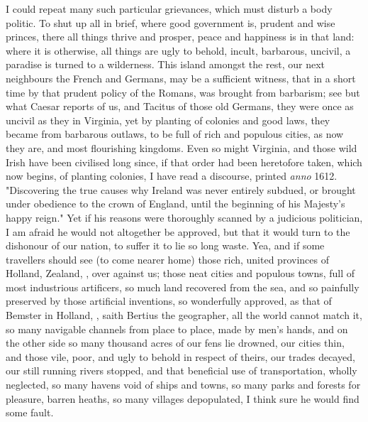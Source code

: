 I could repeat many such particular grievances, which must disturb a body
politic. To shut up all in brief, where good government is, prudent and wise
princes, there all things thrive and prosper, peace and happiness is in that
land: where it is otherwise, all things are ugly to behold, incult, barbarous,
uncivil, a paradise is turned to a wilderness. This island amongst the rest,
our next neighbours the French and Germans, may be a sufficient witness, that
in a short time by that prudent policy of the Romans, was brought from
barbarism; see but what Caesar reports of us, and Tacitus of those old Germans,
they were once as uncivil as they in Virginia, yet by planting of colonies and
good laws, they became from barbarous outlaws, to be full
of rich and populous cities, as now they are, and most flourishing kingdoms.
Even so might Virginia, and those wild Irish have been civilised long since, if
that order had been heretofore taken, which now begins, of planting colonies,
\etc{} I have read a discourse, printed \emph{anno} 1612.
"Discovering the true causes why Ireland was never entirely subdued, or brought
under obedience to the crown of England, until the beginning of his Majesty's
happy reign." Yet if his reasons were thoroughly scanned by a judicious
politician, I am afraid he would not altogether be approved, but that it would
turn to the dishonour of our nation, to suffer it to lie so long waste. Yea,
and if some travellers should see (to come nearer home) those rich, united
provinces of Holland, Zealand, \etc{}, over against us; those neat cities and
populous towns, full of most industrious artificers, so
much land recovered from the sea, and so painfully preserved by those
artificial inventions, so wonderfully approved, as that of Bemster in Holland,
, saith Bertius the
geographer, all the world cannot match it, so many
navigable channels from place to place, made by men's hands, \etc{} and on the
other side so many thousand acres of our fens lie drowned, our cities thin, and
those vile, poor, and ugly to behold in respect of theirs, our trades decayed,
our still running rivers stopped, and that beneficial use of transportation,
wholly neglected, so many havens void of ships and towns, so many parks and
forests for pleasure, barren heaths, so many villages depopulated, \etc{} I
think sure he would find some fault.

